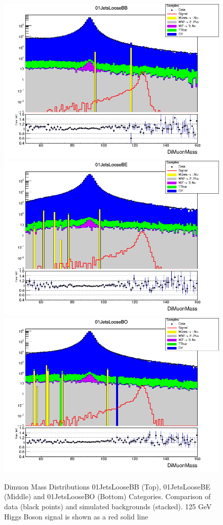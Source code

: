 \begin{figure}[htbp]
  \centering
  \includegraphics[width=0.65\linewidth]{figures/ch_higgs/distributions/baseline_kalman/distribution__01JetsLooseBB__DiMuonMass__logY.png}\\
  \includegraphics[width=0.65\linewidth]{figures/ch_higgs/distributions/baseline_kalman/distribution__01JetsLooseBE__DiMuonMass__logY.png}\\
  \includegraphics[width=0.65\linewidth]{figures/ch_higgs/distributions/baseline_kalman/distribution__01JetsLooseBO__DiMuonMass__logY.png}
  \caption{Dimuon Mass Distributions 01JetsLooseBB (Top), 01JetsLooseBE (Middle) and 01JetsLooseBO (Bottom) Categories. Comparison of data (black points) and simulated backgrounds (stacked). 125 GeV Higgs Boson signal is shown as a red solid line}
  \label{fig:higgs_categorization_01jetsloosebbbebo}
\end{figure}
